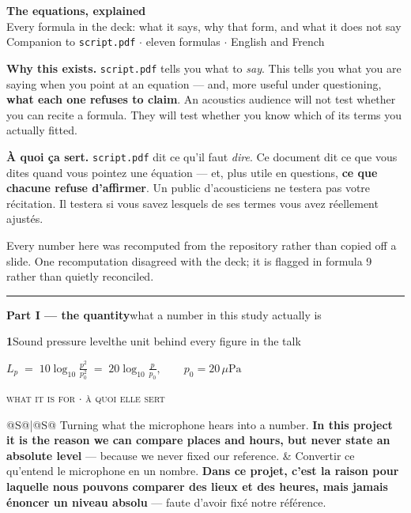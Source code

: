 \documentclass[10pt,a4paper]{article}
\makeatletter
\newcommand{\formula}[3]{%
  \par\vspace{5mm}\noindent
  \colorbox{accent}{\parbox{\dimexpr\textwidth-2\fboxsep}{%
    \color{white}\vspace{.6mm}
    \textbf{#1}\hspace{3mm}#2\hfill\small #3\vspace{.6mm}}}
  \par\vspace{2mm}}
\newcommand{\act}[2]{%
  \par\vspace{7mm}\noindent
  {\color{accent}\rule{\textwidth}{.9pt}}\par\vspace{1.5mm}
  {\large\bfseries\color{accent}#1}\hfill{\color{muted}#2}
  \par\vspace{.5mm}{\color{rule}\rule{\textwidth}{.4pt}}\par}
\newcommand{\eq}[1]{%
  \par\vspace{1mm}\noindent
  \colorbox{wash}{\parbox{\dimexpr\textwidth-2\fboxsep}{%
    \vspace{2mm}\begin{center}$\displaystyle #1$\end{center}\vspace{1mm}}}
  \par\vspace{2mm}}
\newcommand{\forwhat}[2]{%
  \par\vspace{-1mm}\noindent
  {\footnotesize\color{good}\textsc{what it is for \; $\cdot$ \; à quoi elle sert}}
  \par\vspace{1mm}\noindent
  \begin{tabular}{@{}S@{\hspace{5mm}}|@{\hspace{5mm}}S@{}}
    #1 & #2
  \end{tabular}
  \par\vspace{2.5mm}}
\newcommand{\must}[1]{{\color{good}\textbf{#1}}}
\makeatother
\begin{document}

\begin{center}
  {\LARGE\bfseries\color{accent} The equations, explained}\\[1.5mm]
  {\large Every formula in the deck: what it says, why that form, and what it
   does not say}\\[3mm]
  {\color{muted}Companion to \texttt{script.pdf} \; $\cdot$ \; eleven formulas \;
   $\cdot$ \; English and French}
\end{center}

\vspace{4mm}
\noindent
\colorbox{wash}{\parbox{\dimexpr\textwidth-2\fboxsep}{\vspace{1.5mm}
\textbf{Why this exists.} \texttt{script.pdf} tells you what to \emph{say}. This
tells you what you are saying when you point at an equation --- and, more useful
under questioning, \textbf{what each one refuses to claim}. An acoustics audience
will not test whether you can recite a formula. They will test whether you know
which of its terms you actually fitted.

\medskip
{}
\textbf{À quoi ça sert.} \texttt{script.pdf} dit ce qu'il faut \emph{dire}. Ce
document dit ce que vous dites quand vous pointez une équation --- et, plus utile
en questions, \textbf{ce que chacune refuse d'affirmer}. Un public d'acousticiens
ne testera pas votre récitation. Il testera si vous savez lesquels de ses termes
vous avez réellement ajustés.
\vspace{1.5mm}}}

\vspace{3mm}
\noindent
{\footnotesize\color{muted}Every number here was recomputed from the repository
rather than copied off a slide. One recomputation disagreed with the deck; it is
flagged in formula 9 rather than quietly reconciled.}

\clearpage
\act{Part I --- the quantity}{what a number in this study actually is}

\formula{1}{Sound pressure level}{the unit behind every figure in the talk}
\eq{L_p \;=\; 10\log_{10}\!\frac{p^{2}}{p_0^{2}}
    \;=\; 20\log_{10}\!\frac{p}{p_0},
    \qquad p_0 = 20\,\mu\mathrm{Pa}}
\forwhat{Turning what the microphone hears into a number. \must{In this project it
    is the reason we can compare places and hours, but never state an absolute
    level} --- because we never fixed our reference.}{Convertir ce qu'entend le microphone en un nombre. \must{Dans ce projet,
    c'est la raison pour laquelle nous pouvons comparer des lieux et des heures,
    mais jamais énoncer un niveau absolu} --- faute d'avoir fixé notre référence.}
\end{document}
